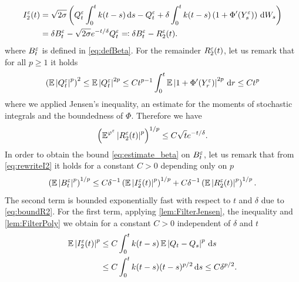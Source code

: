 \documentclass[review,onefignum,onetabnum]{siamonline190516}
\begin{document}
\begin{appendices}
	\begin{equation}\label{eq:rewriteI2}
	\begin{aligned}
		I_2^\epl(t) &= \sqrt{2\sigma} \left(Q_t^\epl\int_0^t k(t-s) \dd s - Q_t^\epl + \delta \int_0^t k(t-s)\left(1 + \Phi'(Y_s^\epl)\right) \dd W_s\right)\\
		  			&= \delta B_t^\epl - \sqrt{2\sigma} e^{-t/\delta} Q_t^\epl \eqdef \delta B_t^\epl - R_2^\epl(t).
	\end{aligned}
	\end{equation}
	where $B_t^\varepsilon$ is defined in \eqref{eq:defBeta}. For the remainder $R_2^\varepsilon(t)$, let us remark that for all $p \geq 1$ it holds
	\begin{equation}\label{eq:BoundQ}
	\begin{aligned}
		\left(\E\abs{Q_t^\epl}^p\right)^2 \leq \E\abs{Q_t^\epl}^{2p} \leq Ct^{p-1}\int_0^t \E \abs{1 + \Phi'(Y_r^\epl)}^{2p} \dd r \leq C t^p
	\end{aligned}
	\end{equation}
	where we applied Jensen's inequality, an estimate for the moments of stochastic integrals \cite[Formula (3.25), p. 163]{KaS91} and the boundedness of $\Phi$. Therefore we have
	\begin{equation}\label{eq:boundR2}
		\left( \E^{\phi^\epl}\abs{R_2^\epl(t)}^p \right)^{1/p} \leq C \sqrt{t} e^{-t/\delta}.
	\end{equation}
	In order to obtain the bound \eqref{eq:estimate_beta} on $B_t^\varepsilon$, let us remark that from \eqref{eq:rewriteI2} it holds for a constant $C > 0$ depending only on $p$ 
	\begin{equation}
		\left(\operatorname{\mathbb{E}}\left\lvert B_t^\varepsilon\right\rvert^p\right)^{1/p}\leq C \delta^{-1}\left(\operatorname{\mathbb{E}}\left\lvert I_2^\varepsilon(t)\right\rvert^p\right)^{1/p} + C \delta^{-1} \left(\operatorname{\mathbb{E}}\left\lvert R_2^\varepsilon(t)\right\rvert^p\right)^{1/p}.
	\end{equation}
	The second term is bounded exponentially fast with respect to $t$ and $\delta$ due to \eqref{eq:boundR2}. For the first term, applying \cref{lem:FilterJensen}, the inequality \cite[Formula (3.25), p. 163]{KaS91} and \cref{lem:FilterPoly} we obtain for a constant $C > 0$ independent of $\delta$ and $t$
	\begin{equation}
	\begin{aligned}
		\operatorname{\mathbb{E}}\left\lvert I_2^\varepsilon(t)\right\rvert^p &\leq C \int_0^t k(t-s) \operatorname{\mathbb{E}}\left\lvert Q_t - Q_s\right\rvert^p \,\mathrm{d} s \\
		&\leq C\int_0^t k(t-s)(t-s)^{p/2} \,\mathrm{d} s \leq C\delta^{p/2}.
	\end{aligned}
	\end{equation} 

\end{appendices}
\end{document}
